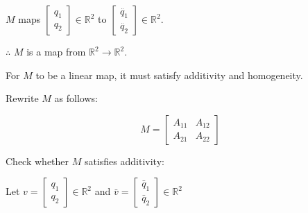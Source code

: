 \documentclass[fleqn]{article}
\begin{document}
\begin{enumerate}[nolistsep]
\begin{enumerate}[nolistsep]
					$M$ maps $\begin{bmatrix}q_1 \\ q_2 \end{bmatrix} \in \mathbb{R}^2$ to $\begin{bmatrix}\ddot{q_1} \\ \ddot{q_2} \end{bmatrix} \in \mathbb{R}^2$.
					
					$\therefore$ $M$ is a map from $\mathbb{R}^2 \rightarrow \mathbb{R}^2$.
					
					For $M$ to be a linear map, it must satisfy additivity and homogeneity.
					
					Rewrite $M$ as follows:
					
					\begin{equation*}
						M = \begin{bmatrix}
							A_{11} & A_{12} \\ A_{21} & A_{22}
						\end{bmatrix}
					\end{equation*}
					
					Check whether $M$ satisfies additivity:
					
					Let $v = \begin{bmatrix}q_1 \\ q_2\end{bmatrix} \in \mathbb{R}^2$ and $\bar{v} = \begin{bmatrix}\bar{q}_1 \\ \bar{q}_2\end{bmatrix} \in \mathbb{R}^2$
					

\end{enumerate}
\end{enumerate}
\end{document}
